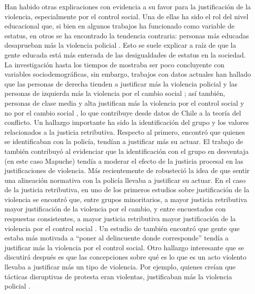 \documentclass[12pt,twoside]{templates/facsothesis}
\begin{document}
Han habido otras explicaciones con evidencia a su favor para la justificación de la violencia, especialmente por el control social. Una de ellas ha sido el rol del nivel educacional que, si bien en algunos trabajos ha funcionado como variable de estatus, en otros se ha encontrado la tendencia contraria: personas más educadas desaprueban más la violencia policial \citep{Gamson1970, Thomas1977}. Esto se suele explicar a raíz de que la gente educada está más enterada de las desigualdades de estatus en la sociedad. La investigación hasta los tiempos de \citet{Thompson2004} mostraba ser poco concluyente con variables sociodemográficas, sin embargo, trabajos con datos actuales han hallado que las personas de derecha tienden a justificar más la violencia policial y las personas de izquierda más la violencia por el cambio social \citep{Puga2016, Gerber2017}; así también, personas de clase media y alta justifican más la violencia por el control social y no por el cambio social \citep{Gerber2017}, lo que contribuye desde datos de Chile a la teoría del conflicto. Un hallazgo importante ha sido la identificación del grupo y los valores relacionados a la justicia retributiva. Respecto al primero, \citet{Blumenthal1972} encontró que quienes se identificaban con la policía, tendían a justificar más su actuar. El trabajo de \citet{Gerber2017b} también contribuyó al evidenciar que la identificación con el grupo en desventaja (en este caso Mapuche) tendía a moderar el efecto de la justicia procesal en las justificaciones de violencia. Más recientemente de \citet{Bradford2017} robusteció la idea de que sentir una alineación normativa con la policía llevaba a justificar su actuar. En el caso de la justicia retributiva, en uno de los primeros estudios sobre justificación de la violencia se encontró que, entre grupos minoritarios, a mayor justicia retributiva mayor justificación de la violencia por el cambio, y entre encuestados con respuestas consistentes, a mayor justicia retributiva mayor justificación de la violencia por el control social \citep{Blumenthal1972}. Un estudio de \citet{Puga2016} también encontró que gente que estaba más motivada a ``poner al delincuente donde corresponde'' tendía a justificar más la violencia por el control social. Otro hallazgo interesante que se discutirá después es que las concepciones sobre qué es lo que es un acto violento llevaba a justificar más un tipo de violencia. Por ejemplo, quienes creían que tácticas disruptivas de protesta eran violentas, justificaban más la violencia policial \citep{Blumenthal1972}.
\end{document}
